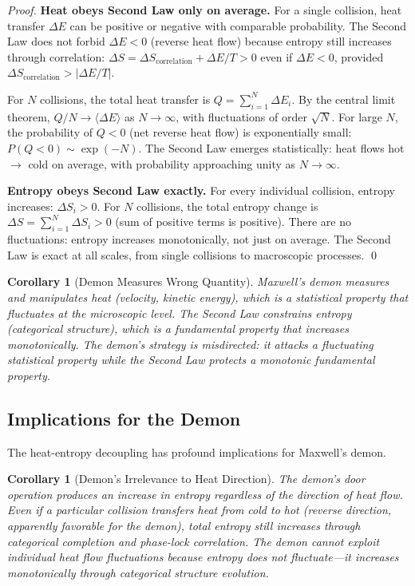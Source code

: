 \documentclass[12pt,a4paper]{article}
\newtheorem{corollary}[theorem]{Corollary}
\theoremstyle{definition}
\theoremstyle{remark}
\begin{document}
\begin{proof}
\textbf{Heat obeys Second Law only on average.}
For a single collision, heat transfer $\Delta E$ can be positive or negative with comparable probability. The Second Law does not forbid $\Delta E < 0$ (reverse heat flow) because entropy still increases through correlation: $\Delta S = \Delta S_{\text{correlation}} + \Delta E / T > 0$ even if $\Delta E < 0$, provided $\Delta S_{\text{correlation}} > |\Delta E / T|$.

For $N$ collisions, the total heat transfer is $Q = \sum_{i=1}^{N} \Delta E_i$. By the central limit theorem, $Q / N \to \langle \Delta E \rangle$ as $N \to \infty$, with fluctuations of order $\sqrt{N}$. For large $N$, the probability of $Q < 0$ (net reverse heat flow) is exponentially small: $P(Q < 0) \sim \exp(-N)$. The Second Law emerges statistically: heat flows hot $\to$ cold on average, with probability approaching unity as $N \to \infty$.

\textbf{Entropy obeys Second Law exactly.}
For every individual collision, entropy increases: $\Delta S_i > 0$. For $N$ collisions, the total entropy change is $\Delta S = \sum_{i=1}^{N} \Delta S_i > 0$ (sum of positive terms is positive). There are no fluctuations: entropy increases monotonically, not just on average. The Second Law is exact at all scales, from single collisions to macroscopic processes. \qed
\end{proof}

\begin{corollary}[Demon Measures Wrong Quantity]
\label{cor:demon_wrong_quantity}
Maxwell's demon measures and manipulates heat (velocity, kinetic energy), which is a statistical property that fluctuates at the microscopic level. The Second Law constrains entropy (categorical structure), which is a fundamental property that increases monotonically. The demon's strategy is misdirected: it attacks a fluctuating statistical property while the Second Law protects a monotonic fundamental property.
\end{corollary}

\subsection{Implications for the Demon}

The heat-entropy decoupling has profound implications for Maxwell's demon.

\begin{corollary}[Demon's Irrelevance to Heat Direction]
\label{cor:demon_irrelevant}
The demon's door operation produces an increase in entropy regardless of the direction of heat flow. Even if a particular collision transfers heat from cold to hot (reverse direction, apparently favorable for the demon), total entropy still increases through categorical completion and phase-lock correlation. The demon cannot exploit individual heat flow fluctuations because entropy does not fluctuate—it increases monotonically through categorical structure evolution.
\end{corollary}
\end{document}
